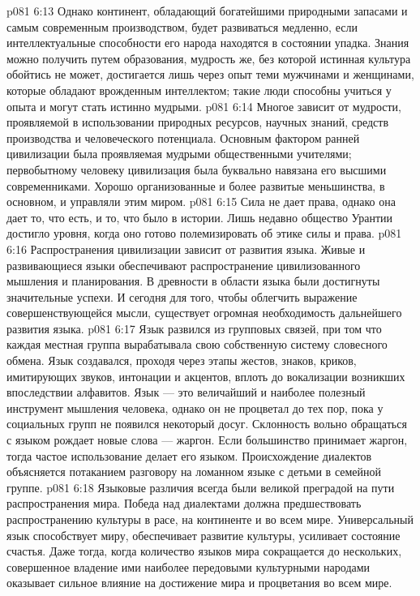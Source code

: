 \vs p081 6:13 Однако континент, обладающий богатейшими природными запасами и самым современным производством, будет развиваться медленно, если интеллектуальные способности его народа находятся в состоянии упадка. Знания можно получить путем образования, мудрость же, без которой истинная культура обойтись не может, достигается лишь через опыт теми мужчинами и женщинами, которые обладают врожденным интеллектом; такие люди способны учиться у опыта и могут стать истинно мудрыми.
\vs p081 6:14 \pc {}\bibnobreakspace {} Многое зависит от мудрости, проявляемой в использовании природных ресурсов, научных знаний, средств производства и человеческого потенциала. Основным фактором ранней цивилизации была  проявляемая мудрыми общественными учителями; первобытному человеку цивилизация была буквально навязана его высшими современниками. Хорошо организованные и более развитые меньшинства, в основном, и управляли этим миром.
\vs p081 6:15 Сила не дает права, однако она дает то, что есть, и то, что было в истории. Лишь недавно общество Урантии достигло уровня, когда оно готово полемизировать об этике силы и права.
\vs p081 6:16 \pc {}\bibnobreakspace {} Распространения цивилизации зависит от развития языка. Живые и развивающиеся языки обеспечивают распространение цивилизованного мышления и планирования. В древности в области языка были достигнуты значительные успехи. И сегодня для того, чтобы облегчить выражение совершенствующейся мысли, существует огромная необходимость дальнейшего развития языка.
\vs p081 6:17 Язык развился из групповых связей, при том что каждая местная группа вырабатывала свою собственную систему словесного обмена. Язык создавался, проходя через этапы жестов, знаков, криков, имитирующих звуков, интонации и акцентов, вплоть до вокализации возникших впоследствии алфавитов. Язык --- это величайший и наиболее полезный инструмент мышления человека, однако он не процветал до тех пор, пока у социальных групп не появился некоторый досуг. Склонность вольно обращаться с языком рождает новые слова --- жаргон. Если большинство принимает жаргон, тогда частое использование делает его языком. Происхождение диалектов объясняется потаканием разговору на ломанном языке с детьми в семейной группе.
\vs p081 6:18 Языковые различия всегда были великой преградой на пути распространения мира. Победа над диалектами должна предшествовать распространению культуры в расе, на континенте и во всем мире. Универсальный язык способствует миру, обеспечивает развитие культуры, усиливает состояние счастья. Даже тогда, когда количество языков мира сокращается до нескольких, совершенное владение ими наиболее передовыми культурными народами оказывает сильное влияние на достижение мира и процветания во всем мире.
